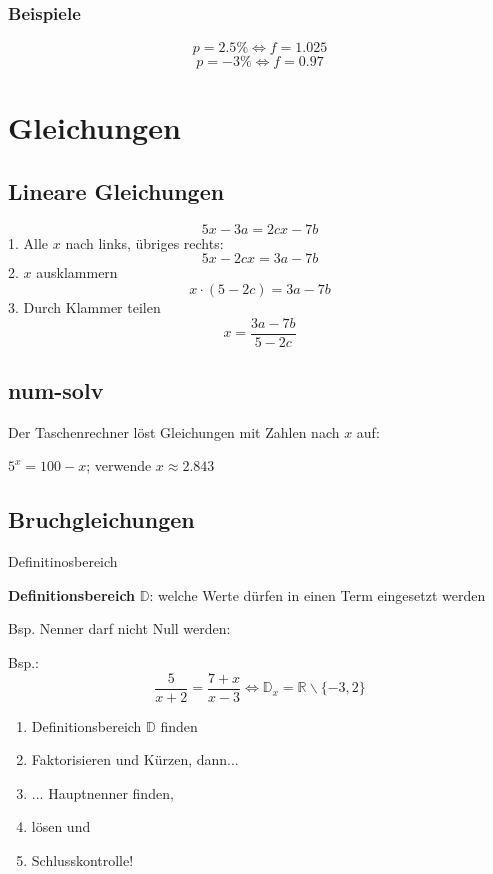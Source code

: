 \begin{multicols}{2}
\subsubsection*{Beispiele}
$$p = 2.5\% \Longleftrightarrow{} f = 1.025$$
$$p = -3\% \Longleftrightarrow{} f = 0.97$$

\hrulefill
\section*{Gleichungen}

\subsection*{Lineare Gleichungen}
$$5x-3a = 2cx-7b$$
1. Alle $x$ nach links, übriges rechts:
$$5x - 2cx = 3a-7b$$
2. $x$ ausklammern
$$x\cdot{}(5-2c) = 3a-7b$$
3. Durch Klammer teilen
$$x = \frac{3a-7b}{5-2c}$$


\subsection*{num-solv}
Der Taschenrechner löst Gleichungen mit Zahlen nach $x$ auf:

$5^x = 100 -x$; verwende  $x\approx{}2.843$



\subsection*{Bruchgleichungen}

\begin{definition*}{Definitinosbereich}{}

\textbf{Definitionsbereich} $\mathbb{D}$: welche Werte dürfen in einen Term eingesetzt werden

Bsp. Nenner darf nicht Null werden:

Bsp.: $$\frac5{x+2}=\frac{7+x}{x-3} \Leftrightarrow{} \mathbb{D}_x=\mathbb{R}\backslash{}\{-3, 2\}$$
\end{definition*}

\begin{rezept*}{}{}
\begin{enumerate}
\item Definitionsbereich $\mathbb{D}$ finden
\item Faktorisieren und Kürzen, dann...
\item ... Hauptnenner finden,
\item lösen und 
\item Schlusskontrolle!
\end{enumerate}
\end{rezept*}

\end{multicols}

